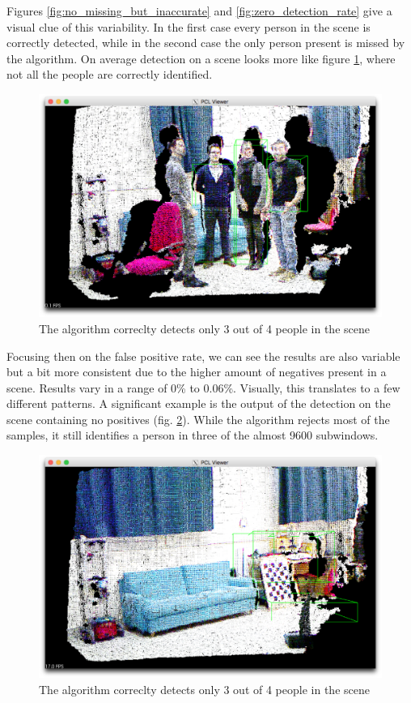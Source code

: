 \documentclass[a4paper,11pt,titlepage]{article}
\begin{document}
Figures \ref{fig:no_missing_but_inaccurate} and \ref{fig:zero_detection_rate}
give a visual clue of this variability. In the first case every person in the
scene is correctly detected, while in the second case the only person present is
missed by the algorithm. On average detection on a scene looks more like
figure \ref{fig:one_missing}, where not all the people are correctly identified.

\begin{figure}[h]
  \centering
  \includegraphics[scale=0.2]{one_missing.png}
  \caption{The algorithm correclty detects only 3 out of 4 people in the scene}
  \label{fig:one_missing}
\end{figure}

Focusing then on the false positive rate, we can see the results are also
variable but a bit more consistent due to the higher amount of negatives present
in a scene. Results vary in a range of 0\% to 0.06\%. Visually, this translates
to a few different patterns. A significant example is the output of the
detection on the scene containing no positives (fig. \ref{fig:false_positives}).
While the algorithm rejects most of the samples, it still identifies a person in
three of the almost 9600 subwindows.

\begin{figure}[h]
  \centering
  \includegraphics[scale=0.2]{false_positives.png}
  \caption{The algorithm correclty detects only 3 out of 4 people in the scene}
  \label{fig:false_positives}
\end{figure}
\end{document}
